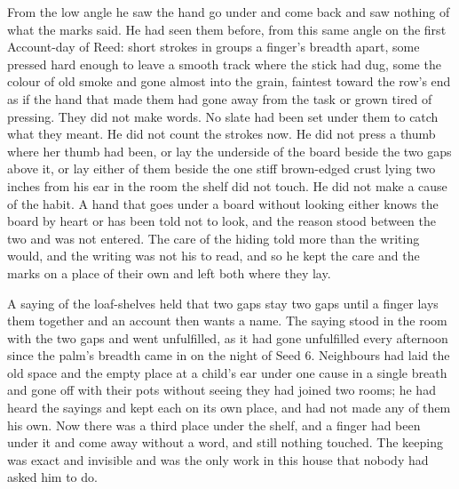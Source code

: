 From the low angle he saw the hand go under and come back and saw nothing of what the marks said. He had seen them before, from this same angle on the first Account-day of Reed: short strokes in groups a finger's breadth apart, some pressed hard enough to leave a smooth track where the stick had dug, some the colour of old smoke and gone almost into the grain, faintest toward the row's end as if the hand that made them had gone away from the task or grown tired of pressing. They did not make  words. No slate had been set under them to catch what they meant. He did not count the strokes now. He did not press a thumb where her thumb had been, or lay the underside of the board beside the two gaps above it, or lay either of them beside the one stiff brown-edged crust lying two inches from his ear in the room the shelf did not touch. He did not make a cause of the habit. A hand that goes under a board without looking either knows the board by heart or has been told not to look, and the reason stood between the two and was not entered. The care of the hiding told more than the writing would, and the writing was not his to read, and so he kept the care and the marks on a place of their own and left both where they lay.

A saying of the loaf-shelves held that two gaps stay two gaps until a finger lays them together and an account then wants a name. The saying stood in the room with the two gaps and went unfulfilled, as it had gone unfulfilled every afternoon since the palm's breadth came in on the night of Seed 6. Neighbours had laid the old space and the empty place at a child's ear under one cause in a single breath and gone off with their pots without seeing they had joined two rooms; he had heard the sayings and kept each on its own place, and had not made any of them his own. Now there was a third place under the shelf, and a finger had been under it and come away without a word, and still nothing touched. The keeping was exact and invisible and was the only work in this house that nobody had asked him to do.

